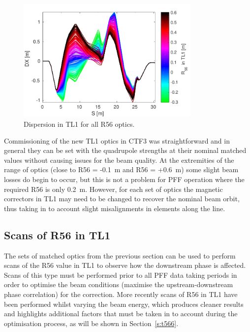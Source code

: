 \begin{figure}
  \centering
  \includegraphics[width=0.8\textwidth]{Figures/propagation/DX}
  \caption{Dispersion in TL1 for all R56 optics.}
  \label{f:tl1DX}
\end{figure}

Commissioning of the new TL1 optics in CTF3 was straightforward and in general they can be set with the quadrupole strengths at their nominal matched values without causing issues for the beam quality. At the extremities of the range of optics (close to R56 = -0.1~m and R56 = +0.6~m) some slight beam losses do begin to occur, but this is not a problem for PFF operation where the required R56 is only 0.2~m. However, for each set of optics the magnetic correctors in TL1 may need to be changed to recover the nominal beam orbit, thus taking in to account slight misalignments in elements along the line.

\subsection{Scans of R56 in TL1}
\label{ss:r56Scans}

The sets of matched optics from the previous section can be used to perform scans of the R56 value in TL1 to observe how the downstream phase is affected. Scans of this type must be performed prior to all PFF data taking periods in order to optimise the beam conditions (maximise the upstream-downstream phase correlation) for the correction. More recently scans of R56 in TL1 have been performed whilst varying the beam energy, which produces cleaner results and highlights additional factors that must be taken in to account during the optimisation process, as will be shown in Section~\ref{s:t566}. 

